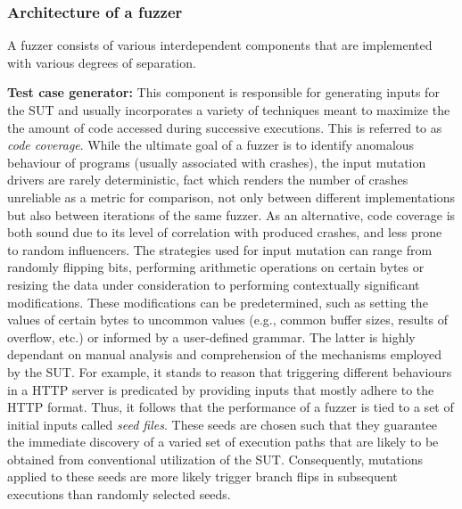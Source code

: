 \subsubsection{Architecture of a fuzzer}
\label{extend:netfuzz:architecture}

A fuzzer consists of various interdependent components that are implemented with various degrees of separation.

\textbf{Test case generator:} This component is responsible for generating inputs for the SUT and usually incorporates a variety of techniques meant to maximize the the amount of code accessed during successive executions. This is referred to as \textit{code coverage}. While the ultimate goal of a fuzzer is to identify anomalous behaviour of programs (usually associated with crashes), the input mutation drivers are rarely deterministic, fact which renders the number of crashes unreliable as a metric for comparison, not only between different implementations but also between iterations of the same fuzzer. As an alternative, code coverage is both sound due to its level of correlation with produced crashes, and less prone to random influencers. The strategies used for input mutation can range from randomly flipping bits, performing arithmetic operations on certain bytes or resizing the data under consideration to performing contextually significant modifications. These modifications can be predetermined, such as setting the values of certain bytes to uncommon values (e.g., common buffer sizes, results of overflow, etc.) or informed by a user-defined grammar. The latter is highly dependant on manual analysis and comprehension of the mechanisms employed by the SUT. For example, it stands to reason that triggering different behaviours in a HTTP server is predicated by providing inputs that mostly adhere to the HTTP format. Thus, it follows that the performance of a fuzzer is tied to a set of initial inputs called \textit{seed files}. These seeds are chosen such that they guarantee the immediate discovery of a varied set of execution paths that are likely to be obtained from conventional utilization of the SUT. Consequently, mutations applied to these seeds are more likely trigger branch flips in subsequent executions than randomly selected seeds.

